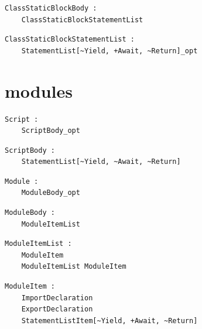 \noindent\textbf{\texttt{}}\par
\begin{lstlisting}
ClassStaticBlockBody :
    ClassStaticBlockStatementList
\end{lstlisting}

\noindent\textbf{\texttt{}}\par
\begin{lstlisting}
ClassStaticBlockStatementList :
    StatementList[~Yield, +Await, ~Return]_opt
\end{lstlisting}

\section{modules}

\noindent\textbf{\texttt{}}\par
\begin{lstlisting}
Script :
    ScriptBody_opt
\end{lstlisting}

\noindent\textbf{\texttt{}}\par
\begin{lstlisting}
ScriptBody :
    StatementList[~Yield, ~Await, ~Return]
\end{lstlisting}

\noindent\textbf{\texttt{}}\par
\begin{lstlisting}
Module :
    ModuleBody_opt
\end{lstlisting}

\noindent\textbf{\texttt{}}\par
\begin{lstlisting}
ModuleBody :
    ModuleItemList
\end{lstlisting}

\noindent\textbf{\texttt{}}\par
\begin{lstlisting}
ModuleItemList :
    ModuleItem
    ModuleItemList ModuleItem
\end{lstlisting}

\noindent\textbf{\texttt{}}\par
\begin{lstlisting}
ModuleItem :
    ImportDeclaration
    ExportDeclaration
    StatementListItem[~Yield, +Await, ~Return]
\end{lstlisting}

